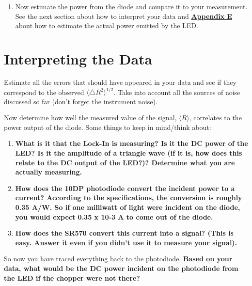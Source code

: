 \documentclass{../lab}
\begin{document}
\begin{enumerate}
    \item Now estimate the power from the diode and compare it to your measurement. See the next section about how to interpret your data and \href{https://berkeley-physics111b.github.io/appendices/LLS-Appendix-E-Interpreting-the-Data-Sheet-for-the-LED/}{\textbf{Appendix E}} about how to estimate the actual power emitted by the LED.

\end{enumerate}

\section{Interpreting the Data}

Estimate all the errors that should have appeared in your data and see if they correspond to the observed $\langle \triangle R^2 \rangle^{1/2}$. Take into account all the sources of noise discussed so far (don't forget the instrument noise).

Now determine how well the measured value of the signal, $\langle  R \rangle$, correlates to the power output of the diode. Some things to keep in mind/think about:

\begin{enumerate}
    \item \textbf{What is it that the Lock-In is measuring? Is it the DC power of the LED? Is it the amplitude of a triangle wave (if it is, how does this relate to the DC output of the LED?)? Determine what you are actually measuring.}

    \item \textbf{How does the 10DP photodiode convert the incident power to a current? According to the specifications, the conversion is roughly 0.35 A/W. So if one milliwatt of light were incident on the diode, you would expect 0.35 x 10-3 A to come out of the diode. }

    \item \textbf{How does the SR570 convert this current into a signal? (This is easy. Answer it even if you didn't use it to measure your signal).}

\end{enumerate}

So now you have traced everything back to the photodiode. \textbf{Based on your data, what would be the DC power incident on the photodiode from the LED if the chopper were not there?}
\end{document}
